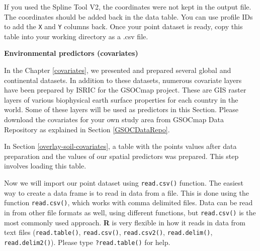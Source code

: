 \documentclass[10pt,b5paper,]{book}
\newenvironment{Shaded}{\begin{snugshade}}{\end{snugshade}}
\newcommand{\CommentTok}[1]{\textcolor[rgb]{0.56,0.35,0.01}{\textit{#1}}}
\newcommand{\KeywordTok}[1]{\textcolor[rgb]{0.13,0.29,0.53}{\textbf{#1}}}
\newcommand{\NormalTok}[1]{#1}
\newcommand{\OperatorTok}[1]{\textcolor[rgb]{0.81,0.36,0.00}{\textbf{#1}}}
\newcommand{\StringTok}[1]{\textcolor[rgb]{0.31,0.60,0.02}{#1}}
\theoremstyle{definition}
\theoremstyle{definition}
\theoremstyle{definition}
\theoremstyle{remark}
\begin{document}
If you used the Spline Tool V2, the coordinates were not kept in the
output file. The coordinates should be added back in the data table. You
can use profile IDs to add the \texttt{X} and \texttt{Y} columns back.
Once your point dataset is ready, copy this table into your working
directory as a .csv file.

\textbf{Environmental predictors (covariates)}

In the Chapter \ref{covariates}, we presented and prepared several
global and continental datasets. In addition to these datasets, numerous
covariate layers have been prepared by ISRIC for the GSOCmap project.
These are GIS raster layers of various biophysical earth surface
properties for each country in the world. Some of these layers will be
used as predictors in this Section. Please download the covariates for
your own study area from GSOCmap Data Repository as explained in Section
\ref{GSOCDataRepo}.

In Section \ref{overlay-soil-covariates}, a table with the points values
after data preparation and the values of our spatial predictors was
prepared. This step involves loading this table.

Now we will import our point dataset using \texttt{read.csv()} function.
The easiest way to create a data frame is to read in data from a file.
This is done using the function \texttt{read.csv()}, which works with
comma delimited files. Data can be read in from other file formats as
well, using different functions, but \texttt{read.csv()} is the most
commonly used approach. \textbf{R} is very flexible in how it reads in
data from text files (\texttt{read.table()}, \texttt{read.csv()},
\texttt{read.csv2()}, \texttt{read.delim()}, \texttt{read.delim2()}).
Please type \texttt{?read.table()} for help.

\begin{Shaded}
\end{Shaded}
\end{document}
